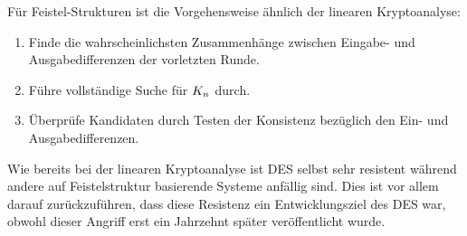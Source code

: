 Für Feistel-Strukturen ist die Vorgehensweise ähnlich der linearen Kryptoanalyse:
\begin{enumerate}
	\item Finde die wahrscheinlichsten Zusammenhänge zwischen Eingabe- und Ausgabedifferenzen der vorletzten Runde.
	\item Führe vollständige Suche für $K_n$ durch.
	\item Überprüfe Kandidaten durch Testen der Konsistenz bezüglich den Ein- und Ausgabedifferenzen.
\end{enumerate}

Wie bereits bei der linearen Kryptoanalyse ist DES selbst sehr resistent während andere auf Feistelstruktur basierende Systeme anfällig sind. Dies ist vor
allem darauf zurückzuführen, dass diese Resistenz ein Entwicklungsziel des DES war, obwohl dieser Angriff erst ein Jahrzehnt später veröffentlicht wurde.
